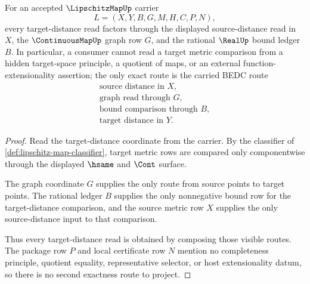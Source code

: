 \begin{theorem}
\label{thm:lipschitz-map-target-distance-exactness}
For an accepted $\LipschitzMapUp$ carrier
$$
L=(X,Y,B,G,M,H,C,P,N),
$$
every target-distance read factors through the displayed source-distance read
in $X$, the $\ContinuousMapUp$ graph row $G$, and the rational $\RealUp$ bound
ledger $B$. In particular, a consumer cannot read a target metric comparison
from a hidden target-space principle, a quotient of maps, or an external
function-extensionality assertion; the only exact route is the carried BEDC
route
$$
\begin{gathered}
\text{source distance in } X,\\
\text{graph read through } G,\\
\text{bound comparison through } B,\\
\text{target distance in } Y.
\end{gathered}
$$
\end{theorem}
\begin{proof}
Read the target-distance coordinate from the carrier. By the classifier of
\autoref{def:lipschitz-map-classifier}, target metric rows are compared only
componentwise through the displayed $\hsame$ and $\Cont$ surface.

The graph coordinate $G$ supplies the only route from source points to target
points. The rational ledger $B$ supplies the only nonnegative bound row for the
target-distance comparison, and the source metric row $X$ supplies the only
source-distance input to that comparison.

Thus every target-distance read is obtained by composing those visible routes.
The package row $P$ and local certificate row $N$ mention no completeness
principle, quotient equality, representative selector, or host extensionality
datum, so there is no second exactness route to project.
\end{proof}

